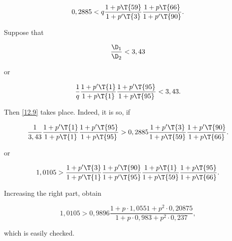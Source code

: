 \begin{equation}\label{12.9}
	0,2885
	<
	q
	\dfrac{1 + p \T{59}}{1 + p' \T{3}}
	\dfrac{1 + p \T{66}}{1 + p' \T{90}}.
\end{equation}

Suppose that

\begin{equation}\label{eq:goodness-condition-3,43}
	\dfrac{\D_1}{\D_2} < 3,43
\end{equation}

or

\begin{equation*}
	\dfrac{1}{q}
	\dfrac{1 + p' \T{1}}{1 + p \T{1}}
	\dfrac{1 + p' \T{95}}{1 + p \T{95}}
	<
	3,43.
\end{equation*}

Then \ref{12.9} takes place. Indeed, it is so, if

\begin{equation*}
	\dfrac{1}{3,43}
	\dfrac{1 + p' \T{1}}{1 + p \T{1}}
	\dfrac{1 + p' \T{95}}{1 + p \T{95}}
	>
	0,2885
	\dfrac{1 + p' \T{3}}{1 + p \T{59}}
	\dfrac{1 + p' \T{90}}{1 + p \T{66}}.
\end{equation*}

or

\begin{equation*}
	1,0105
	>
	\dfrac{1 + p' \T{3}}{1 + p' \T{1}}
	\dfrac{1 + p' \T{90}}{1 + p' \T{95}}
	\dfrac{1 + p \T{1}}{1 + p \T{59}}
	\dfrac{1 + p \T{95}}{1 + p \T{66}}.
\end{equation*}

Increasing the right part, obtain

\begin{equation*}
	1,0105
	>
	0,9896
	\dfrac
	{1 + p \cdot 1,0551 + p^2 \cdot 0,20875}
	{1 + p \cdot 0,983 + p^2 \cdot 0,237},
\end{equation*}

which is easily checked.
